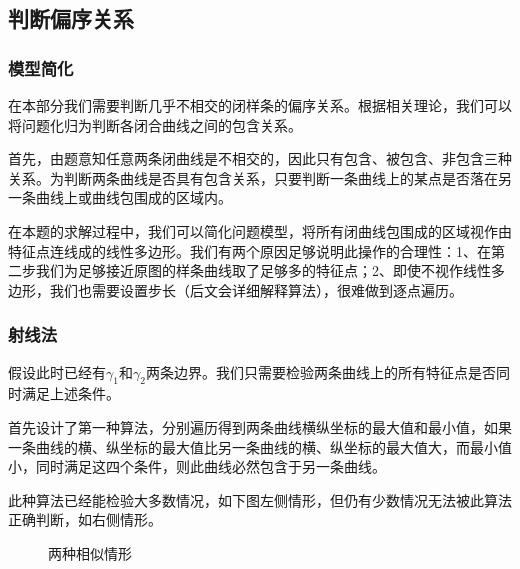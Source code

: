 \documentclass{article}
\begin{document}
	\newpage
	\subsection{判断偏序关系}
	\subsubsection{模型简化}
	在本部分我们需要判断几乎不相交的闭样条的偏序关系。根据相关理论，我们可以将问题化归为判断各闭合曲线之间的包含关系。
	
	首先，由题意知任意两条闭曲线是不相交的，因此只有包含、被包含、非包含三种关系。为判断两条曲线是否具有包含关系，只要判断一条曲线上的某点是否落在另一条曲线上或曲线包围成的区域内。
	
	在本题的求解过程中，我们可以简化问题模型，将所有闭曲线包围成的区域视作由特征点连线成的线性多边形。我们有两个原因足够说明此操作的合理性：1、在第二步我们为足够接近原图的样条曲线取了足够多的特征点；2、即使不视作线性多边形，我们也需要设置步长（后文会详细解释算法），很难做到逐点遍历。
	
	\subsubsection{射线法}
	假设此时已经有$\gamma_1$和$\gamma_2$两条边界。我们只需要检验两条曲线上的所有特征点是否同时满足上述条件。
	
	首先设计了第一种算法，分别遍历得到两条曲线横纵坐标的最大值和最小值，如果一条曲线的横、纵坐标的最大值比另一条曲线的横、纵坐标的最大值大，而最小值小，同时满足这四个条件，则此曲线必然包含于另一条曲线。
	
	此种算法已经能检验大多数情况，如下图左侧情形，但仍有少数情况无法被此算法正确判断，如右侧情形。
	\begin{figure}[h]
		\centering
		\caption{两种相似情形}
	\end{figure}
	
\end{document}

